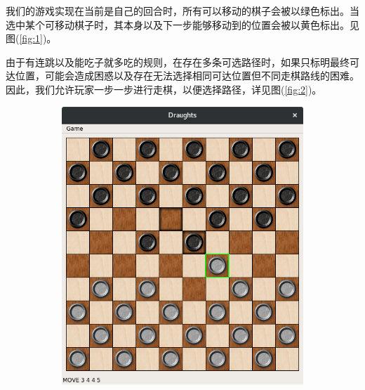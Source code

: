 \documentclass[11pt,a4paper]{article}
\begin{document}
我们的游戏实现在当前是自己的回合时，所有可以移动的棋子会被以绿色标出。当选中某个可移动棋子时，其本身以及下一步能够移动到的位置会被以黄色标出。见图(\ref{fig:1})。

由于有连跳以及能吃子就多吃的规则，在存在多条可选路径时，如果只标明最终可达位置，可能会造成困惑以及存在无法选择相同可达位置但不同走棋路线的困难。因此，我们允许玩家一步一步进行走棋，以便选择路径，详见图(\ref{fig:2})。

\begin{figure}[H]
	\centering
	\begin{subfigure}{.24\textwidth}
		\centering
		\includegraphics[width=\linewidth]{img7.png}
		\caption{}
	\end{subfigure}
	\hfill
	\begin{subfigure}{.24\textwidth}
		\centering

\end{subfigure}
\end{figure}
\end{document}
